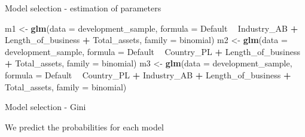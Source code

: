 \documentclass[9pt,ignorenonframetext,]{beamer}
\newenvironment{Shaded}{\begin{snugshade}}{\end{snugshade}}
\newcommand{\KeywordTok}[1]{\textcolor[rgb]{0.13,0.29,0.53}{\textbf{#1}}}
\newcommand{\DataTypeTok}[1]{\textcolor[rgb]{0.13,0.29,0.53}{#1}}
\newcommand{\StringTok}[1]{\textcolor[rgb]{0.31,0.60,0.02}{#1}}
\newcommand{\OperatorTok}[1]{\textcolor[rgb]{0.81,0.36,0.00}{\textbf{#1}}}
\newcommand{\NormalTok}[1]{#1}
\begin{document}
\begin{frame}[fragile]{Model selection - estimation of parameters}

\begin{Shaded}
\begin{Highlighting}[]
\NormalTok{m1 <-}\StringTok{ }\KeywordTok{glm}\NormalTok{(}\DataTypeTok{data =}\NormalTok{ development_sample,}
          \DataTypeTok{formula =}\NormalTok{ Default }\OperatorTok{~}\StringTok{ }\NormalTok{Industry_AB }\OperatorTok{+}\StringTok{ }\NormalTok{Length_of_business }\OperatorTok{+}
\StringTok{                              }\NormalTok{Total_assets,}
          \DataTypeTok{family =}\NormalTok{ binomial)}
\NormalTok{m2 <-}\StringTok{ }\KeywordTok{glm}\NormalTok{(}\DataTypeTok{data =}\NormalTok{ development_sample,}
          \DataTypeTok{formula =}\NormalTok{ Default }\OperatorTok{~}\StringTok{ }\NormalTok{Country_PL }\OperatorTok{+}\StringTok{ }\NormalTok{Length_of_business }\OperatorTok{+}
\StringTok{                              }\NormalTok{Total_assets,}
          \DataTypeTok{family =}\NormalTok{ binomial)}
\NormalTok{m3 <-}\StringTok{ }\KeywordTok{glm}\NormalTok{(}\DataTypeTok{data =}\NormalTok{ development_sample,}
          \DataTypeTok{formula =}\NormalTok{ Default }\OperatorTok{~}\StringTok{ }\NormalTok{Country_PL }\OperatorTok{+}\StringTok{ }\NormalTok{Industry_AB }\OperatorTok{+}
\StringTok{                              }\NormalTok{Length_of_business }\OperatorTok{+}\StringTok{ }\NormalTok{Total_assets,}
          \DataTypeTok{family =}\NormalTok{ binomial)}
\end{Highlighting}
\end{Shaded}

\end{frame}

\begin{frame}[fragile]{Model selection - Gini}

We predict the probabilities for each model

\begin{Shaded}
\end{Shaded}

\end{frame}
\end{document}
